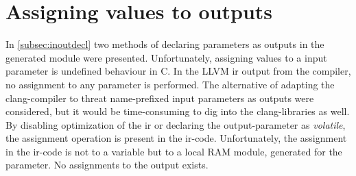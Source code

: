 \section{\label{sec:assValueToOutput}Assigning values to outputs}
In \cref{subsec:inoutdecl} two methods of declaring parameters as outputs in the generated module were presented. Unfortunately, assigning values to a input parameter is undefined behaviour in C. In the LLVM \gls{ir} output from the compiler, no assignment to any parameter is performed. The alternative of adapting the clang-compiler to threat name-prefixed input parameters as outputs were considered, but it would be time-consuming to dig into the clang-libraries as well. By disabling optimization of the \gls{ir} or declaring the output-parameter as \textit{volatile}, the assignment operation is present in the \gls{ir}-code. Unfortunately, the assignment in the \gls{ir}-code is not to a variable but to a local RAM module, generated for the parameter. No assignments to the output exists.

